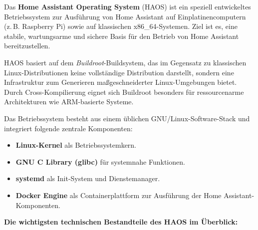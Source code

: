 Das \textbf{Home Assistant Operating System} (HAOS) ist ein speziell entwickeltes Betriebssystem zur Ausführung von Home Assistant auf Einplatinencomputern (z.\,B. Raspberry Pi) sowie auf klassischen x86\_64-Systemen. Ziel ist es, eine stabile, wartungsarme und sichere Basis für den Betrieb von Home Assistant bereitzustellen.

\vspace{0.5em}
\noindent
HAOS basiert auf dem \textit{Buildroot}-Buildsystem, das im Gegensatz zu klassischen Linux-Distributionen keine vollständige Distribution darstellt, sondern eine Infrastruktur zum Generieren maßgeschneiderter Linux-Umgebungen bietet. Durch Cross-Kompilierung eignet sich Buildroot besonders für ressourcenarme Architekturen wie ARM-basierte Systeme. 

Das Betriebssystem besteht aus einem üblichen GNU/Linux-Software-Stack und integriert folgende zentrale Komponenten:

\begin{itemize}
  \item \textbf{Linux-Kernel} als Betriebssystemkern.\\
  \item \textbf{GNU C Library (glibc)} für systemnahe Funktionen.\\
  \item \textbf{systemd} als Init-System und Dienstemanager.\\
  \item \textbf{Docker Engine} als Containerplattform zur Ausführung der Home Assistant-Komponenten.
\end{itemize}

\vspace{0.5em}

\noindent
\textbf{Die wichtigsten technischen Bestandteile des HAOS im Überblick:}

